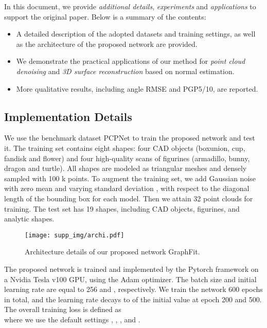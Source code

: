 \documentclass[runningheads]{llncs}
\begin{document}
In this document, we provide \emph{additional details}, \emph{experiments} and \emph{applications} to support the original paper. Below is a summary of the contents:
\begin{itemize}
    \item A detailed description of the adopted datasets and training settings, as well as the architecture of the proposed network are provided.
    \item We demonstrate the practical applications of our method for \emph{point cloud denoising} and \emph{3D surface reconstruction} based on normal estimation.
    \item More qualitative results, including angle RMSE and PGP5/10, are reported.
\end{itemize}


\subsection{Implementation Details}
\label{sec:implement}
We use the benchmark dataset PCPNet \cite{guerrero2018pcpnet} to train the proposed network and test it. The training set contains eight shapes: four CAD objects (boxunion, cup, fandisk and flower) and four high-quality scans of figurines (armadillo, bunny, dragon and turtle). All shapes are modeled as triangular meshes and densely sampled with 100 k points. To augment the training set, we add Gaussian noise with zero mean and varying standard deviation , with respect to the diagonal length of the bounding box for each model. Then we attain 32 point clouds for training. The test set has 19 shapes, including CAD objects, figurines, and analytic shapes.


\begin{figure}[]
  \centering
 \texttt{[image: supp\_img/archi.pdf]}
  \caption{Architecture details of our proposed network GraphFit.}
  \label{fig:GraphFit}
\end{figure}
The proposed network is trained and implemented by the Pytorch framework on a Nvidia Tesla v100 GPU, using the Adam optimizer\cite{kingma2014adam}. The batch size and initial learning rate are equal to 256 and , respectively. We train the network 600 epochs in total, and the learning rate decays to  of the initial value at epoch 200 and 500. The overall training loss is defined as
\\





where we use the default settings , , , and .
\end{document}
